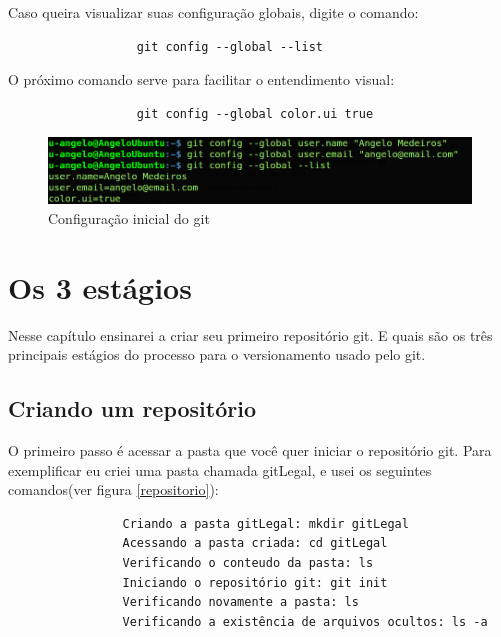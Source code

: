 \documentclass[12pt,openright,oneside,a4paper,english,brazil]{abntex2}
\begin{document}
Caso queira visualizar suas configuração globais, digite o comando:

\begin{verbatim}
		          git config --global --list
\end{verbatim}

O próximo comando serve para facilitar o entendimento visual:

		\begin{verbatim}
		          git config --global color.ui true
		\end{verbatim}

\begin{figure}[h]
	\caption{\label{configuracao}Configuração inicial do git}
	\begin{center}
		\includegraphics[width=1\linewidth]{configuracao}
	\end{center}
\end{figure}

\chapter{Os 3 estágios}

Nesse capítulo ensinarei a criar seu primeiro repositório git. E quais são os três principais estágios do processo para o versionamento usado pelo git.

\section{Criando um repositório}

O primeiro passo é acessar a pasta que você quer iniciar o repositório git. Para exemplificar eu criei uma pasta chamada gitLegal, e usei os seguintes comandos(ver figura \ref{repositorio}):

\begin{verbatim}
		        Criando a pasta gitLegal: mkdir gitLegal
		        Acessando a pasta criada: cd gitLegal
		        Verificando o conteudo da pasta: ls
		        Iniciando o repositório git: git init
		        Verificando novamente a pasta: ls
		        Verificando a existência de arquivos ocultos: ls -a
\end{verbatim}
\end{document}
